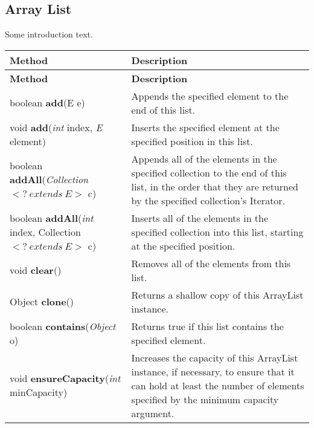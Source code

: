 \documentclass[main]{subfiles}
\begin{document}

\subsection{Array List}
\renewcommand{\arraystretch}{1.5}


Some introduction text.

\scriptsize
\begin{longtable}{p{0.4\linewidth} p{0.6\linewidth}}
\hline \textbf{Method} & \textbf{Description}\\ \hline
\endfirsthead

\hline \textbf{Method} & \textbf{Description}\\ \hline\hline
\endhead
boolean \textbf{add}(E e) &
Appends the specified element to the end of this list.\\

void \textbf{add}(\textit{int} index, \textit{E} element) &
Inserts the specified element at the specified position in this list.\\

boolean \textbf{addAll}(\textit{Collection}$<?~extends~E>$ c) &
Appends all of the elements in the specified collection to the end of this list, in the order that they are returned by the specified collection's Iterator.\\
boolean \textbf{addAll}(\textit{int} index, Collection$<?~extends~E>$ c) &
Inserts all of the elements in the specified collection into this list, starting at the specified position.\\

void \textbf{clear}() &
Removes all of the elements from this list.\\

Object \textbf{clone}() &
Returns a shallow copy of this ArrayList instance.\\

boolean \textbf{contains}(\textit{Object} o) &
Returns true if this list contains the specified element.\\

void \textbf{ensureCapacity}(\textit{int} minCapacity) &
Increases the capacity of this ArrayList instance, if necessary, to ensure that it can hold at least the number of elements specified by the minimum capacity argument.\\


\end{longtable}
\end{document}
